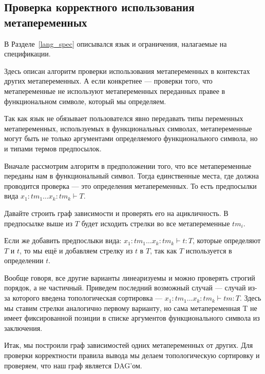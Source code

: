 \subsection{Проверка корректного использования метапеременных}\label{toposort}
В Разделе~\ref{lang_spec} описывался язык и ограничения, налагаемые на спецификации.

Здесь описан алгоритм проверки использования метапеременных в контекстах других метапеременных. А если конкретнее --- проверки того, что метапеременные не используют метапеременных переданных правее в функциональном символе, который мы определяем.

Так как язык не обязывает пользователся явно передавать типы переменных метапеременных, используемых в функциональных символах, метапеременные могут быть не только аргументами определяемого функционального символа, но и типами термов предпосылок.

Вначале рассмотрим алгоритм в предположении того, что все метапеременные переданы нам в функциональный символ. Тогда единственные места, где должна проводится проверка --- это определения метапеременных. То есть предпосылки вида $x_1 : tm_1 \ldots x_k : tm_k  \vdash T$.

Давайте строить граф зависимости и проверять его на ацикличность. В предпосылке выше из $T$ будет исходить стрелки во все метапеременные $tm_i$.

Если же добавить предпослыки вида: $x_1 : tm_1 \ldots x_k : tm_k  \vdash t : T$, которые определяют $T$ и $t$, то мы ещё и добавляем стрелку из $t$ в $T$, так как $T$ используется в определении $t$.

Вообще говоря, все другие варианты линеаризуемы и можно проверять строгий порядок, а не частичный. Приведем последний возможный случай --- случай из-за которого введена топологическая сортировка --- $x_1 : tm_1 \ldots x_k : tm_k  \vdash tm : T$. Здесь мы ставим стрелки аналогично первому варианту, но сама метапеременная T не имеет фиксированной позиции в списке аргументов функционального символа из заключения.

Итак, мы построили граф зависимостей одних метапеременных от других. Для проверки корректности правила вывода мы делаем топологическую сортировку и проверяем, что наш граф является DAG'ом.

























